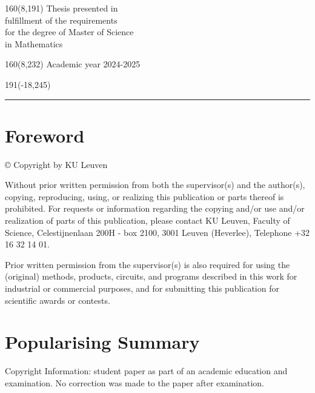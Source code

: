 \documentclass[
  12pt,
  a4paper,
  oneside]{book}
\begin{document}
%
\begin{textblock}{160}(8,191)
\textblockcolour{}
\vspace{-\parskip}
\flushright
Thesis presented in\\[4.5pt]
fulfillment of the requirements\\[4.5pt]
for the degree of Master of Science\\[4.5pt]
in Mathematics\\
\end{textblock}
%
\begin{textblock}{160}(8,232)
\textblockcolour{}
\vspace{-\parskip}
\flushright
Academic year 2024-2025
\end{textblock}
%
\begin{textblock}{191}(-18,245)
{\color{blueline}\rule{550pt}{5.5pt}}
\end{textblock}
%
\vfill
\newpage

\chapter*{Foreword}\label{foreword}

\vfill

© Copyright by KU Leuven

Without prior written permission from both the supervisor(s) and the author(s), copying, reproducing, using, or realizing this publication or parts thereof is prohibited. For requests or information regarding the copying and/or use and/or realization of parts of this publication, please contact KU Leuven, Faculty of Science, Celestijnenlaan 200H - box 2100, 3001 Leuven (Heverlee), Telephone +32 16 32 14 01.

Prior written permission from the supervisor(s) is also required for using the (original) methods, products, circuits, and programs described in this work for industrial or commercial purposes, and for submitting this publication for scientific awards or contests.

\chapter{Popularising Summary}\label{popularising-summary}

\vfill

Copyright Information: student paper as part of an academic education and examination. No correction was made to the paper after examination.
\end{document}
